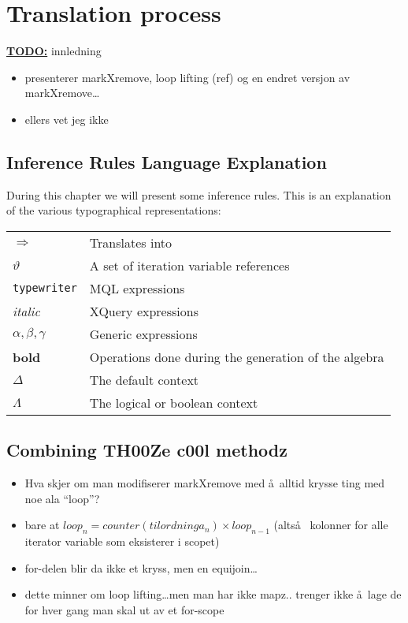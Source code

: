 \chapter{Translation process}


\textbf{\underline{\LARGE TODO:}} innledning
\begin{itemize}
  \item presenterer markXremove, loop lifting (ref) og en endret versjon av
  markXremove\ldots
  \item ellers vet jeg ikke
\end{itemize}


\section{Inference Rules Language Explanation}
\label{sect:translation:inferenceExplanation}
During this chapter we will present some inference rules. This is an explanation
of the various typographical representations:

\begin{tabular}{l|l}

  $\Longrightarrow$  & Translates into \\
  $\vartheta$ & A set of iteration variable references \\
  \texttt{typewriter} & MQL expressions \\
  \textit{italic} & XQuery expressions \\
  $\alpha , \beta, \gamma$ & Generic expressions \\
  \textbf{bold} & Operations done during the generation of the algebra \\
  $\Delta$ & The default context \\
  $\Lambda$ & The logical or boolean context \\
  
\end{tabular}








\section{Combining TH00Ze c00l methodz}
\begin{itemize}
  \item Hva skjer om man modifiserer markXremove med \aa~alltid krysse ting med
  noe ala ``loop''?
  \item bare at $loop_{n} = counter(tilordninga_{n}) \times loop_{n-1}$
  (alts\aa~ kolonner for alle iterator variable som eksisterer i scopet)
  \item for-delen blir da ikke et kryss, men en equijoin\ldots
  \item dette minner om loop lifting\ldots men man har ikke mapz.. trenger ikke
  \aa~lage de for hver gang man skal ut av et for-scope
\end{itemize}
